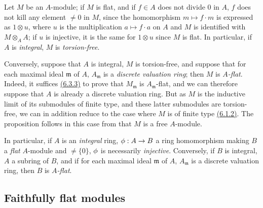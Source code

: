 \begin{env}[6.3.4]
\label{0.6.3.4}
Let $M$ be an $A$-module; if $M$ is flat, and if $f\in A$ does not divide $0$ in $A$, $f$
does not kill any element $\neq 0$ in $M$, since the homomorphism $m\mapsto f\cdot m$ is
expressed as $1\otimes u$, where $u$ is the multiplication $a\mapsto f\cdot a$ on $A$ and
$M$ is identified with $M\otimes_A A$; if $u$ is injective, it is the same for $1\otimes u$
since $M$ is flat. In particular, if $A$ is {\em integral}, $M$ is {\em torsion-free}.

Conversely, suppose that $A$ is integral, $M$ is torsion-free, and suppose that for each
maximal ideal $\mathfrak{m}$ of $A$, $A_\mathfrak{m}$ is a {\em discrete valuation ring};
then $M$ is {\em $A$-flat}. Indeed, it suffices \hyperref[0.6.3.3]{(6.3.3)} to prove that
$M_\mathfrak{m}$ is $A_\mathfrak{m}$-flat, and we can therefore suppose that $A$ is already
a discrete valuation ring. But as $M$ is the inductive limit of its submodules of finite
type, and these latter submodules are torsion-free, we can in addition reduce to the case
where $M$ is of finite type \hyperref[0.6.1.2]{(6.1.2)}. The proposition follows in this
case from that $M$ is a free $A$-module.

In particular, if $A$ is an {\em integral} ring, $\phi:A\to B$ a ring homomorphism making
$B$ a {\em flat} $A$-module and $\neq\{0\}$, $\phi$ is necessarily {\em injective}.
Conversely, if $B$ is integral, $A$ a subring of $B$, and if for each maximal ideal
$\mathfrak{m}$ of $A$, $A_\mathfrak{m}$ is a discrete valuation ring, then $B$ is
{\em $A$-flat}.
\end{env}

\subsection{Faithfully flat modules}
\label{subsection-faithfully-flat-modules}

